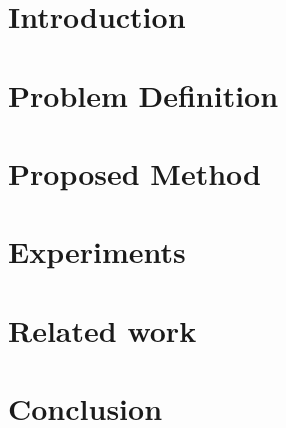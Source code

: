 \documentclass[sigconf,preprint]{acmart}
\newcommand{\lh}[1]{{\small\color{blue}{\bf LH: #1}}}
\begin{document}

\maketitle


\section{Introduction}





\section{Problem Definition}\label{problem-definition}



\section{Proposed Method}\label{overview}
\label{sec:method}


\section{Experiments}\label{experiments}



\section{Related work}\label{related-work}



\section{Conclusion}\label{conclusion}









\end{document}
